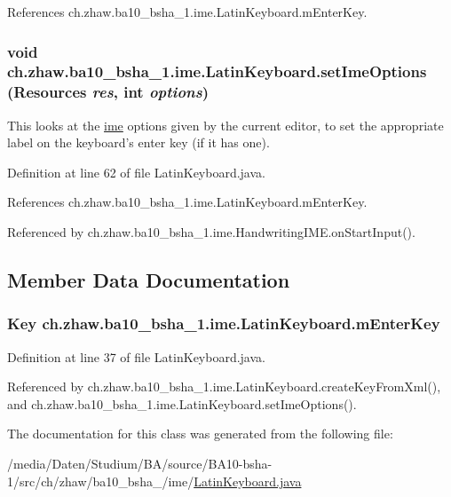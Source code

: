 References ch.zhaw.ba10\_\-bsha\_\-1.ime.LatinKeyboard.mEnterKey.\hypertarget{classch_1_1zhaw_1_1ba10__bsha__1_1_1ime_1_1LatinKeyboard_adf5bb7364614b740d3360ed911912f31}{
\subsubsection[{setImeOptions}]{\setlength{\rightskip}{0pt plus 5cm}void ch.zhaw.ba10\_\-bsha\_\-1.ime.LatinKeyboard.setImeOptions (Resources {\em res}, \/  int {\em options})}}
\label{classch_1_1zhaw_1_1ba10__bsha__1_1_1ime_1_1LatinKeyboard_adf5bb7364614b740d3360ed911912f31}
This looks at the \hyperlink{namespacech_1_1zhaw_1_1ba10__bsha__1_1_1ime}{ime} options given by the current editor, to set the appropriate label on the keyboard's enter key (if it has one). 

Definition at line 62 of file LatinKeyboard.java.

References ch.zhaw.ba10\_\-bsha\_\-1.ime.LatinKeyboard.mEnterKey.

Referenced by ch.zhaw.ba10\_\-bsha\_\-1.ime.HandwritingIME.onStartInput().

\subsection{Member Data Documentation}
\hypertarget{classch_1_1zhaw_1_1ba10__bsha__1_1_1ime_1_1LatinKeyboard_ad656281b2f3876c565a1b8d5ec514fe4}{
\subsubsection[{mEnterKey}]{\setlength{\rightskip}{0pt plus 5cm}Key {\bf ch.zhaw.ba10\_\-bsha\_\-1.ime.LatinKeyboard.mEnterKey}}}
\label{classch_1_1zhaw_1_1ba10__bsha__1_1_1ime_1_1LatinKeyboard_ad656281b2f3876c565a1b8d5ec514fe4}


Definition at line 37 of file LatinKeyboard.java.

Referenced by ch.zhaw.ba10\_\-bsha\_\-1.ime.LatinKeyboard.createKeyFromXml(), and ch.zhaw.ba10\_\-bsha\_\-1.ime.LatinKeyboard.setImeOptions().

The documentation for this class was generated from the following file:\begin{DoxyCompactItemize}
\item 
/media/Daten/Studium/BA/source/BA10-\/bsha-\/1/src/ch/zhaw/ba10\_\-bsha\_/ime/\hyperlink{LatinKeyboard_8java}{LatinKeyboard.java}\end{DoxyCompactItemize}
